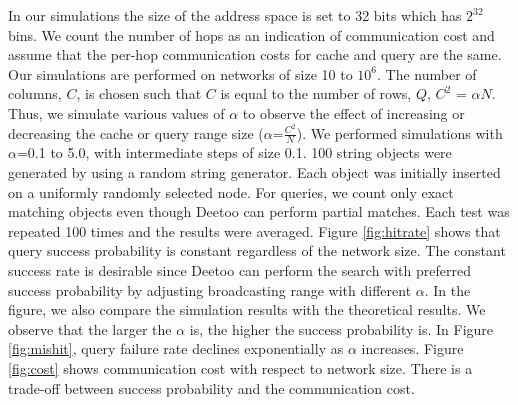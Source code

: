 \documentclass[9.5pt,journal,final,finalsubmission,twocolumn]{IEEEtran}
\begin{document}
In our simulations the size of the address space is set to 32 bits which has $2^{32}$
bins. 
We count the number of hops as an indication of communication cost and assume that the 
per-hop communication costs for cache and query are the same. 
Our simulations are performed on networks of size 10 to $10^{6}$.
The number of columns, $C$, is chosen such that $C$ is equal to the number of rows, $Q$, 
$C^2$ = $\alpha N$. Thus, we simulate various values of $\alpha$ to observe the effect of
increasing or decreasing the cache or query range size ($\alpha$=$\frac{C^2}{N}$). 
We performed simulations with $\alpha$=0.1 to 5.0, with intermediate steps of size 0.1.
100 string objects were generated by using a random string generator.
Each object was initially inserted on a uniformly randomly selected
node.
For queries, we count only exact matching objects even though Deetoo can perform partial matches.
Each test was repeated 100 times and the results were averaged. 
Figure \ref{fig:hitrate} shows that query success probability is constant regardless of 
the network size. The constant success rate is desirable since 
Deetoo can perform the search with preferred success probability by adjusting 
broadcasting range with different $\alpha$.  
In the figure, we also compare the simulation results with the theoretical results.
We observe that the larger the $\alpha$ is, the higher the success probability is.
In Figure \ref{fig:mishit}, query failure rate declines exponentially as $\alpha$ increases.
%
Figure \ref{fig:cost} shows communication cost with respect to network size. There is 
a trade-off between success probability and the communication cost. 
\end{document}

